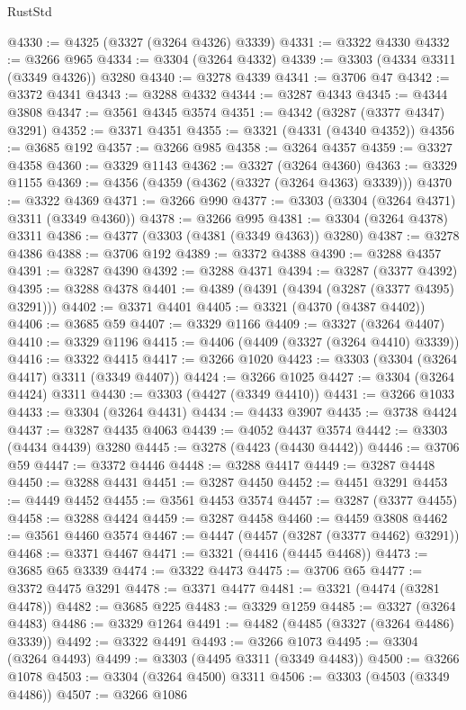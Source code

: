 \begin{lexlean}{RustStd}
\begin{coremodule}
@4330 := @4325 (@3327 (@3264 @4326) @3339)
@4331 := @3322 @4330
@4332 := @3266 @965
@4334 := @3304 (@3264 @4332)
@4339 := @3303 (@4334 @3311 (@3349 @4326)) @3280
@4340 := @3278 @4339
@4341 := @3706 @47
@4342 := @3372 @4341
@4343 := @3288 @4332
@4344 := @3287 @4343
@4345 := @4344 @3808
@4347 := @3561 @4345 @3574
@4351 := @4342 (@3287 (@3377 @4347) @3291)
@4352 := @3371 @4351
@4355 := @3321 (@4331 (@4340 @4352))
@4356 := @3685 @192
@4357 := @3266 @985
@4358 := @3264 @4357
@4359 := @3327 @4358
@4360 := @3329 @1143
@4362 := @3327 (@3264 @4360)
@4363 := @3329 @1155
@4369 := @4356 (@4359 (@4362 (@3327 (@3264 @4363) @3339)))
@4370 := @3322 @4369
@4371 := @3266 @990
@4377 := @3303 (@3304 (@3264 @4371) @3311 (@3349 @4360))
@4378 := @3266 @995
@4381 := @3304 (@3264 @4378) @3311
@4386 := @4377 (@3303 (@4381 (@3349 @4363)) @3280)
@4387 := @3278 @4386
@4388 := @3706 @192
@4389 := @3372 @4388
@4390 := @3288 @4357
@4391 := @3287 @4390
@4392 := @3288 @4371
@4394 := @3287 (@3377 @4392)
@4395 := @3288 @4378
@4401 := @4389 (@4391 (@4394 (@3287 (@3377 @4395) @3291)))
@4402 := @3371 @4401
@4405 := @3321 (@4370 (@4387 @4402))
@4406 := @3685 @59
@4407 := @3329 @1166
@4409 := @3327 (@3264 @4407)
@4410 := @3329 @1196
@4415 := @4406 (@4409 (@3327 (@3264 @4410) @3339))
@4416 := @3322 @4415
@4417 := @3266 @1020
@4423 := @3303 (@3304 (@3264 @4417) @3311 (@3349 @4407))
@4424 := @3266 @1025
@4427 := @3304 (@3264 @4424) @3311
@4430 := @3303 (@4427 (@3349 @4410))
@4431 := @3266 @1033
@4433 := @3304 (@3264 @4431)
@4434 := @4433 @3907
@4435 := @3738 @4424
@4437 := @3287 @4435 @4063
@4439 := @4052 @4437 @3574
@4442 := @3303 (@4434 @4439) @3280
@4445 := @3278 (@4423 (@4430 @4442))
@4446 := @3706 @59
@4447 := @3372 @4446
@4448 := @3288 @4417
@4449 := @3287 @4448
@4450 := @3288 @4431
@4451 := @3287 @4450
@4452 := @4451 @3291
@4453 := @4449 @4452
@4455 := @3561 @4453 @3574
@4457 := @3287 (@3377 @4455)
@4458 := @3288 @4424
@4459 := @3287 @4458
@4460 := @4459 @3808
@4462 := @3561 @4460 @3574
@4467 := @4447 (@4457 (@3287 (@3377 @4462) @3291))
@4468 := @3371 @4467
@4471 := @3321 (@4416 (@4445 @4468))
@4473 := @3685 @65 @3339
@4474 := @3322 @4473
@4475 := @3706 @65
@4477 := @3372 @4475 @3291
@4478 := @3371 @4477
@4481 := @3321 (@4474 (@3281 @4478))
@4482 := @3685 @225
@4483 := @3329 @1259
@4485 := @3327 (@3264 @4483)
@4486 := @3329 @1264
@4491 := @4482 (@4485 (@3327 (@3264 @4486) @3339))
@4492 := @3322 @4491
@4493 := @3266 @1073
@4495 := @3304 (@3264 @4493)
@4499 := @3303 (@4495 @3311 (@3349 @4483))
@4500 := @3266 @1078
@4503 := @3304 (@3264 @4500) @3311
@4506 := @3303 (@4503 (@3349 @4486))
@4507 := @3266 @1086

\end{coremodule}
\end{lexlean}

